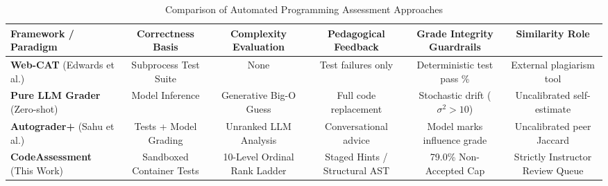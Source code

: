 \begin{table}[!t]
\centering
\caption{Comparison of Automated Programming Assessment Approaches}
\label{tab:related_work_comparison}
\begin{tabular}{lccccc}
\toprule
\textbf{Framework / Paradigm} & \textbf{Correctness Basis} & \textbf{Complexity Evaluation} & \textbf{Pedagogical Feedback} & \textbf{Grade Integrity Guardrails} & \textbf{Similarity Role} \\
\midrule
\textbf{Web-CAT} (Edwards et al.)~\cite{edwards2008webcat} & Subprocess Test Suite & None & Test failures only & Deterministic test pass \% & External plagiarism tool \\
\textbf{Pure LLM Grader} (Zero-shot) & Model Inference & Generative Big-O Guess & Full code replacement & Stochastic drift ($\sigma^2 > 10$) & Uncalibrated self-estimate \\
\textbf{Autograder+} (Sahu et al.)~\cite{sahu2026autograder} & Tests + Model Grading & Unranked LLM Analysis & Conversational advice & Model marks influence grade & Uncalibrated peer Jaccard \\
\textbf{CodeAssessment} (This Work) & Sandboxed Container Tests & 10-Level Ordinal Rank Ladder & Staged Hints / Structural AST & 79.0\% Non-Accepted Cap & Strictly Instructor Review Queue \\
\bottomrule
\end{tabular}
\end{table}
